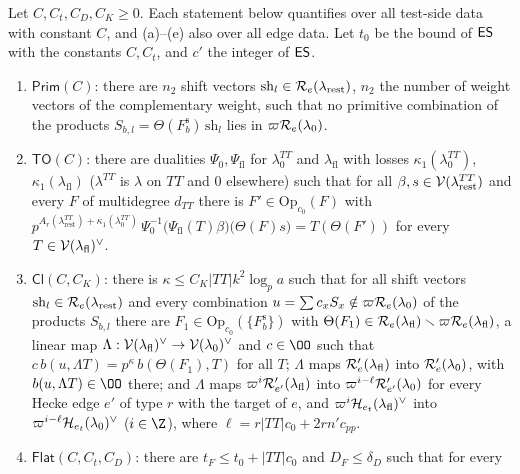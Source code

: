 \begin{definition}\label{pf:linkG:teststeps}
Let $C,C_t,C_D,C_K\ge0$. Each statement below quantifies over all test-side data with constant $C$, and (a)--(e) also over
all edge data. Let $t_0$ be the bound of $\mathsf{ES}$ with the constants $C,C_t$, and $c'$ the integer of $\mathsf{ES}$.
\begin{enumerate}[label=(\alph*)]
\item $\mathsf{Prim}(C)$: there are $n_2$ shift vectors $\mathrm{sh}_l\in\mathcal R_e(\lambda_{\mathrm{rest}})$, $n_2$ the number of
weight vectors of the complementary weight, such that no primitive combination of the products
$S_{b,l}=\Theta(F^{\mathrm s}_b)\,\mathrm{sh}_l$ lies in $\varpi\mathcal R_e(\lambda_0)$.
\item $\mathsf{TO}(C)$: there are dualities $\Psi_0,\Psi_{\mathrm{fl}}$ for $\lambda_0^{TT}$ and $\lambda_{\mathrm{fl}}$ with losses
$\kappa_1(\lambda_0^{TT})$, $\kappa_1(\lambda_{\mathrm{fl}})$ ($\lambda^{TT}$ is $\lambda$ on $TT$ and $0$ elsewhere) such that for all
$\beta,s\in\mathcal V(\lambda^{TT}_{\mathrm{rest}})$ and every $F$ of multidegree $d_{TT}$ there is $F'\in\mathrm{Op}_{c_0}(F)$ with
$p^{A_r(\lambda^{TT}_{\mathrm{rest}})+\kappa_1(\lambda_0^{TT})}\,\Psi_0^{-1}\bigl(\Psi_{\mathrm{fl}}(T)\beta\bigr)\bigl(\Theta(F)s\bigr)
=T(\Theta(F'))$ for every $T\in\mathcal V(\lambda_{\mathrm{fl}})^\vee$.
\item $\mathsf{Cl}(C,C_K)$: there is $\kappa\le C_K|TT|k^2\log_pa$ such that for all shift vectors
$\mathrm{sh}_l\in\mathcal R_e(\lambda_{\mathrm{rest}})$ and every combination $u=\sum c_xS_x\notin\varpi\mathcal R_e(\lambda_0)$ of the
products $S_{b,l}$ there are $F_1\in\mathrm{Op}_{c_0}(\{F^{\mathrm s}_b\})$ with $\Theta(F_1)\in\mathcal R_e(\lambda_{\mathrm{fl}})\smallsetminus
\varpi\mathcal R_e(\lambda_{\mathrm{fl}})$, a linear map $\Lambda:\mathcal V(\lambda_{\mathrm{fl}})^\vee\to\mathcal V(\lambda_0)^\vee$ and
$c\in\OO$ such that $c\,b(u,\Lambda T)=p^\kappa\,b(\Theta(F_1),T)$ for all $T$; $\Lambda$ maps $\mathcal R'_e(\lambda_{\mathrm{fl}})$
into $\mathcal R'_e(\lambda_0)$, with $b(u,\Lambda T)\in\OO$ there; and $\Lambda$ maps $\varpi^i\mathcal R'_{e'}(\lambda_{\mathrm{fl}})$ into
$\varpi^{i-\ell}\mathcal R'_{e'}(\lambda_0)$ for every Hecke edge $e'$ of type $r$ with the target of $e$, and
$\varpi^i\mathcal H_{e_t}(\lambda_{\mathrm{fl}})^\vee$ into $\varpi^{i-\ell}\mathcal H_{e_t}(\lambda_0)^\vee$ ($i\in\Z$), where
$\ell=r|TT|c_0+2rn'c_{pp}$.
\item $\mathsf{Flat}(C,C_t,C_D)$: there are $t_F\le t_0+|TT|c_0$ and $D_F\le\delta_D$ such that for every

\end{enumerate}
\end{definition}
